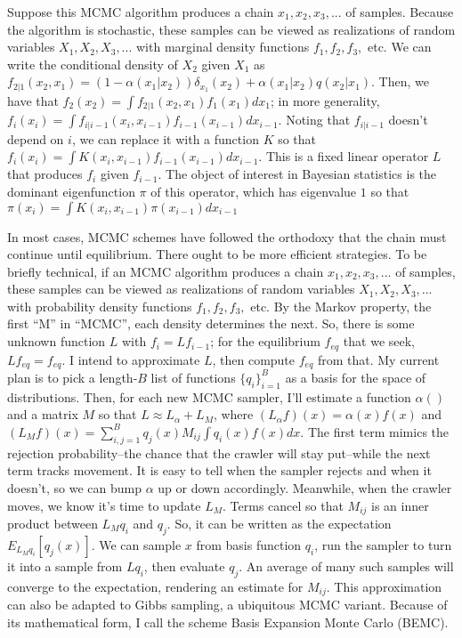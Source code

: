 \documentclass{article}
\begin{document}
Suppose this MCMC algorithm produces a chain $ x_1, x_2, x_3, ...$ of samples. Because the algorithm is stochastic, these samples can be viewed as realizations of random variables $X_1, X_2, X_3, ...$ with marginal density functions $f_1, f_2, f_3, $ etc. We can write the conditional density of $X_2$ given $X_1$ as $f_{2|1}(x_2, x_1) = (1-\alpha(x_1|x_2))\delta_{x_1}(x_2) + \alpha(x_1|x_2)q(x_2|x_1)$. Then, we have that $f_2(x_2) = \int f_{2|1}(x_2, x_1)f_1(x_1)dx_1$; in more generality, $f_i(x_i) = \int f_{i|i-1}(x_i, x_{i-1})f_{i-1}(x_{i-1})dx_{i-1}$. Noting that $f_{i|i-1}$ doesn't depend on $i$, we can replace it with a function $K$ so that $f_i(x_i) = \int K(x_i, x_{i-1})f_{i-1}(x_{i-1})dx_{i-1}$. This is a fixed linear operator $L$ that produces $f_{i}$ given $f_{i-1}$. The object of interest in Bayesian statistics is the dominant eigenfunction $\pi$ of this operator, which has eigenvalue $1$ so that $\pi(x_i) = \int K(x_i, x_{i-1})\pi(x_{i-1})dx_{i-1}$



In most cases, MCMC schemes have followed the orthodoxy that the chain must continue until equilibrium. There ought to be more efficient strategies. To be briefly technical, if an MCMC algorithm produces a chain $ x_1, x_2, x_3, ...$ of samples, these samples can be viewed as realizations of random variables $X_1, X_2, X_3, ...$ with probability density functions $f_1, f_2, f_3, $ etc. By the Markov property, the first ``M'' in ``MCMC'', each density determines the next. So, there is some unknown function $L$ with $f_i=Lf_{i-1}$; for the equilibrium $f_{eq}$ that we seek, $Lf_{eq}=f_{eq}$. I intend to approximate $L$, then compute $f_{eq}$ from that. My current plan is to pick a length-$B$ list of functions $\{q_i\}_{i=1}^B$ as a basis for the space of distributions. Then, for each new MCMC sampler, I'll estimate a function $\alpha()$ and a matrix $M$ so that $L \approx L_{\alpha}+L_{M}$, where $ (L_{\alpha}f)(x) = \alpha(x)f(x)$ and $(L_{M}f)(x) =  \sum_{i,j=1}^B q_j(x)M_{ij}\int q_i(x)f(x)dx$. The first term mimics the rejection probability--the chance that the crawler will stay put--while the next term tracks movement. It is easy to tell when the sampler rejects and when it doesn't, so we can bump $\alpha$ up or down accordingly. Meanwhile, when the crawler moves, we know it's time to update $L_{M}$. Terms cancel so that $M_{ij}$ is an inner product between $L_{M}q_i$ and $q_j$. So, it can be written as the expectation $E_{L_{M}q_i}[q_j(x)]$. We can sample $x$ from basis function $q_i$, run the sampler to turn it into a sample from $Lq_i$, then evaluate $q_j$. An average of many such samples will converge to the expectation, rendering an estimate for $M_{ij}$. This approximation can also be adapted to Gibbs sampling, a ubiquitous MCMC variant. Because of its mathematical form, I call the scheme Basis Expansion Monte Carlo (BEMC). 



\end{document}
